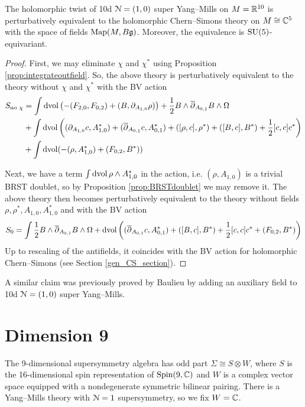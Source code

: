 \documentclass[10pt, oneside]{article}
\begin{document}
\begin{theorem}
The holomorphic twist of 10d $\mathcal{N}=(1, 0)$ super Yang--Mills on $M=\mathbb R^{10}$ is perturbatively equivalent to the holomorphic Chern--Simons theory on $M\cong\mathbb C^5$ with the space of fields $\operatorname{Map}(M, B\mathfrak{g})$. Moreover, the equivalence is $\mathrm{SU}(5)$-equivariant.
\label{thm:10dholomorphictwist}
\end{theorem}
\begin{proof}
First, we may eliminate $\chi$ and $\chi^*$ using Proposition \ref{prop:integrateoutfield}. So, the above theory is perturbatively equivalent to the theory without $\chi$ and $\chi^*$ with the BV action
\begin{align*}
S_{\text{no }\chi} &= \int \operatorname{dvol} \left(-(F_{2, 0}, F_{0, 2}) + (B, \partial_{A_{1, 0}} \rho)\right)  + \frac{1}{2}B\wedge \overline{\partial}_{A_{0, 1}} B\wedge\Omega \\
&+ \int \operatorname{dvol}\left((\partial_{A_{1, 0}} c, A_{1, 0}^*) + (\overline{\partial}_{A_{0, 1}} c, A_{0, 1}^*) + ([\rho, c], \rho^*) + ([B, c], B^*) + \frac{1}{2}[c, c]c^*\right) \\
&+ \int \operatorname{dvol}(-(\rho, A_{1, 0}^*) + (F_{0, 2}, B^*))
\end{align*}

Next, we have a term $\int \operatorname{dvol} \rho\wedge A_{1, 0}^*$ in the action, i.e. $(\rho, A_{1, 0})$ is a trivial BRST doublet, so by Proposition \ref{prop:BRSTdoublet} we may remove it. The above theory then becomes perturbatively equivalent to the theory without fields $\rho,\rho^*,A_{1,0},A_{1,0}^*$ and with the BV action
\[
S_0 = \int \frac{1}{2}B\wedge \overline{\partial}_{A_{0, 1}} B\wedge\Omega + \operatorname{dvol}\left((\overline{\partial}_{A_{0, 1}} c, A_{0, 1}^*) + ([B, c], B^*) + \frac{1}{2}[c, c]c^* + (F_{0, 2}, B^*)\right)
\]
Up to rescaling of the antifields, it coincides with the BV action for holomorphic Chern--Simons (see Section \ref{gen_CS_section}).
\end{proof}

\begin{remark}
A similar claim was previously proved by Baulieu \cite{Baulieu} by adding an auxiliary field to 10d $\mathcal{N}=(1, 0)$ super Yang--Mills.
\end{remark}

\section{Dimension 9} \label{9d_section}

The 9-dimensional supersymmetry algebra has odd part $\Sigma\cong S\otimes W$, where $S$ is the 16-dimensional spin representation of $\mathrm{Spin}(9, \mathbb C)$ and $W$ is a complex vector space equipped with a nondegenerate symmetric bilinear pairing. There is a Yang--Mills theory with $\mathcal{N}=1$ supersymmetry, so we fix $W = \mathbb C$.
\end{document}

